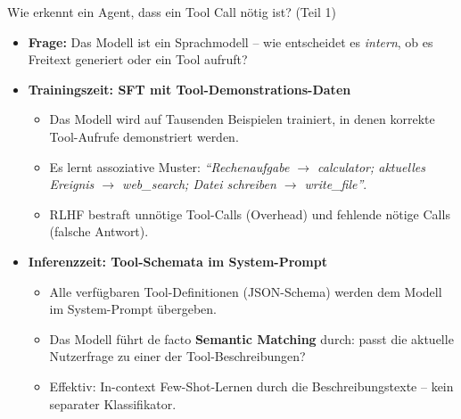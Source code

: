 \documentclass[aspectratio=1610, xcolor=dvipsnames, 9pt]{beamer}
\begin{document}
\begin{frame}{Wie erkennt ein Agent, dass ein Tool Call nötig ist? (Teil 1)}
  \begin{itemize}
    \item \textbf{Frage:} Das Modell ist ein Sprachmodell -- wie entscheidet es \emph{intern}, ob es Freitext generiert oder ein Tool aufruft?
    \item \textbf{Trainingszeit: SFT mit Tool-Demonstrations-Daten}
      \begin{itemize}
        \item Das Modell wird auf Tausenden Beispielen trainiert, in denen korrekte Tool-Aufrufe demonstriert werden.
        \item Es lernt assoziative Muster: \emph{``Rechenaufgabe $\rightarrow$ calculator; aktuelles Ereignis $\rightarrow$ web\_search; Datei schreiben $\rightarrow$ write\_file''}.
        \item RLHF bestraft unnötige Tool-Calls (Overhead) und fehlende nötige Calls (falsche Antwort).
      \end{itemize}
    \vspace{0.2cm}
    \item \textbf{Inferenzzeit: Tool-Schemata im System-Prompt}
      \begin{itemize}
        \item Alle verfügbaren Tool-Definitionen (JSON-Schema) werden dem Modell im System-Prompt übergeben.
        \item Das Modell führt de facto \textbf{Semantic Matching} durch: passt die aktuelle Nutzerfrage zu einer der Tool-Beschreibungen?
        \item Effektiv: In-context Few-Shot-Lernen durch die Beschreibungstexte -- kein separater Klassifikator.
      \end{itemize}
  \end{itemize}
\end{frame}
\end{document}
